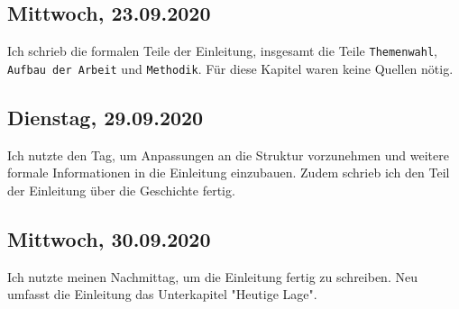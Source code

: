 \documentclass[../main.tex]{subfiles}
\begin{document}
	
	\subsection{Mittwoch, 23.09.2020}
	Ich schrieb die formalen Teile der Einleitung, insgesamt die Teile \texttt{Themenwahl}, \texttt{Aufbau der Arbeit} und \texttt{Methodik}.
	Für diese Kapitel waren keine Quellen nötig.
	
	
	\subsection{Dienstag, 29.09.2020}
	Ich nutzte den Tag, um Anpassungen an die Struktur vorzunehmen und weitere formale Informationen in die Einleitung einzubauen.
	Zudem schrieb ich den Teil der Einleitung über die Geschichte fertig.
	
	\subsection{Mittwoch, 30.09.2020}
	Ich nutzte meinen Nachmittag, um die Einleitung fertig zu schreiben.
	Neu umfasst die Einleitung das Unterkapitel "Heutige Lage".
	
\end{document}
